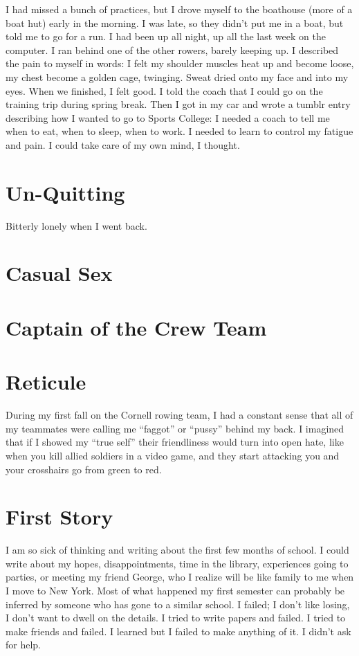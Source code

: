 \documentclass[12pt]{article}
\begin{document}
I had missed a bunch of practices, but I drove myself to the boathouse (more of
a boat hut) early in the morning.  I was late, so they didn't put me in a boat,
but told me to go for a run.  I had been up all night, up all the last week on
the computer.  I ran behind one of the other rowers, barely keeping up.  I
described the pain to myself in words: I felt my shoulder muscles heat up and
become loose, my chest become a golden cage, twinging.  Sweat dried onto my face
and into my eyes.  When we finished, I felt good.  I told the coach that I could
go on the training trip during spring break.  Then I got in my car and wrote a
tumblr entry describing how I wanted to go to Sports College: I needed a coach
to tell me when to eat, when to sleep, when to work.  I needed to learn to
control my fatigue and pain.  I could take care of my own mind, I thought.





\section{Un-Quitting}
Bitterly lonely when I went back.

\section{Casual Sex}

\section{Captain of the Crew Team}

\section{Reticule}
During my first fall on the Cornell rowing team, I had a constant sense that
all of my teammates were calling me ``faggot'' or ``pussy'' behind my back.  I
imagined that if I showed my ``true self'' their friendliness would turn into
open hate, like when you kill allied soldiers in a video game, and they start
attacking you and your crosshairs go from green to red.  


\section{First Story}
I am so sick of thinking and writing about the first few months of school.  I
could write about my hopes, disappointments, time in the library, experiences
going to parties, or meeting my friend George, who I realize will be like family
to me when I move to New York.  Most of what happened my first semester can
probably be inferred by someone who has gone to a similar school.  I failed; I
don't like losing, I don't want to dwell on the details.  I tried to write
papers and failed.  I tried to make friends and failed.  I learned but I failed
to make anything of it.  I didn't ask for help.
\end{document}
